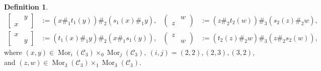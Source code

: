 \documentclass[11pt, reqno]{amsart} %
\newcommand{\mor}{{\mathop{\mathrm{Mor}}}}
\newcommand{\cC}{{\mathcal{C}}}
\theoremstyle{definition}
\newtheorem{definition}[theorem]{Definition}
\theoremstyle{remark}
\numberwithin{equation}{section}
\begin{document}
\begin{definition}
\begin{align}
  \nonumber
  \begin{bmatrix}& y \\ x &\end{bmatrix} &:= (x\#_1t_1(y))\#_2(s_1(x)\#_1y), &
  \begin{pmatrix}& w \\ z &\end{pmatrix} &:= (z\#_2t_2(w))\#_3(s_2(z)\#_2w), \\
  \nonumber
  \begin{bmatrix}x& \\ &y\end{bmatrix} &:= (t_1(x)\#_1y)\#_2(x\#_1s_1(y)), &
  \begin{pmatrix}z & \\ & w\end{pmatrix} &:= (t_2(z)\#_2w)\#_3(z\#_2s_2(w)),
\end{align}
where $(x,y)\in \mor_i(\cC_3)\times_0\mor_j(\cC_3),~(i,j)=(2,2),(2,3),(3,2)$, and $(z,w)\in \mor_3(\cC_3)\times_1\mor_3(\cC_3)$.


\end{definition}
\end{document}

